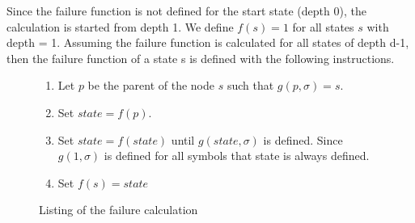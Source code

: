 \documentclass[english,twoside,censored,csm,algorithms-track-2020]{HYthesisML}
\theoremstyle{plain}
\theoremstyle{definition}
\begin{document}
  Since the failure function is not defined for the start state (depth 0), the calculation is started
  from depth 1. We define $f(s)=1$ for all states $s$ with depth = 1. Assuming the failure function is
  calculated for all states of depth d-1, then the failure function of a state s is defined with the
  following instructions.
  
  \begin{figure}[h]
  \begin{enumerate}
  \item Let $p$ be the parent of the node $s$ such that $g(p,\sigma) = s$.
  \item Set $state = f(p)$.
  \item Set $state = f(state)$ until $g(state,\sigma)$ is defined. Since $g(1,\sigma)$ is defined
    for all symbols that state is always defined.
  \item Set $f(s) = state$
  \end{enumerate}
   \caption{Listing of the failure calculation} \label{lst-failure-calculation}    
  \end{figure}
\end{document}
